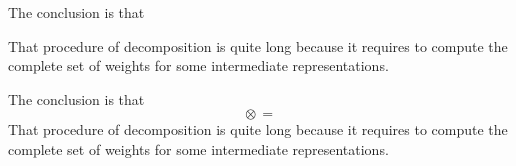 
The conclusion is that
\begin{center}
    
\end{center}
That procedure of decomposition is quite long because it requires to compute the complete set of weights for some intermediate representations.



The conclusion is that
\begin{equation}
    \text{}\otimes\text{}=
\end{equation}
That procedure of decomposition is quite long because it requires to compute the complete set of weights for some intermediate representations.
